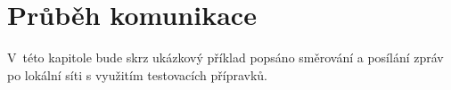 \chapter{Průběh komunikace}
V~této kapitole bude skrz ukázkový příklad popsáno směrování a posílání zpráv po lokální síti s využitím testovacích přípravků.
